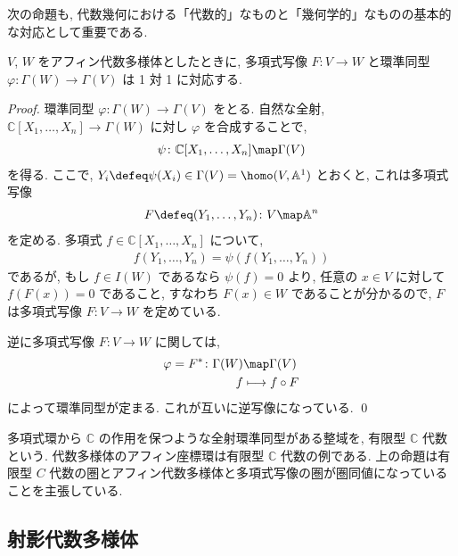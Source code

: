 \documentclass[openany, a4paper, oneside]{jsbook}
\begin{document}
次の命題も, 代数幾何における「代数的」なものと「幾何学的」なものの基本的な対応として重要である.
\begin{prop}
$V$, $W$ をアフィン代数多様体としたときに,
多項式写像 $F \colon V \to W$ と環準同型 $\varphi \colon \Gamma (W) \to \Gamma (V)$ は 1 対 1 に対応する. \fin
\end{prop}
\begin{proof}
環準同型 $\varphi \colon \Gamma (W) \to \Gamma (V)$ をとる.
自然な全射, $\mathbb{C}[X_1,\dots,X_n] \to \Gamma (W)$ に対し $\varphi$ を合成することで,
\begin{align}
 \psi \colon \mathbb{C}[X_1,\dots,X_n] \map \Gamma (V)
\end{align}
を得る.
ここで, $Y_i \defeq  \psi (X_i) \in \Gamma (V) = \homo (V, \mathbb{A}^1)$ とおくと, これは多項式写像
\begin{align}
 F
 \defeq
 (Y_1,\dots,Y_n) \colon V \map \mathbb{A}^n
\end{align}
を定める.
多項式 $f \in \mathbb{C}[X_1,\dots,X_n]$ について,
\begin{align}
 f(Y_1,\dots,Y_n)
 =
 \psi(f(Y_1,\dots,Y_n))
\end{align}
であるが, もし $f \in I (W)$ であるなら $\psi (f)=0$ より,
任意の $x \in V$ に対して $f (F (x))=0$ であること,
すなわち $F (x) \in W$ であることが分かるので, $F$ は多項式写像 $F \colon V \to W$ を定めている.

逆に多項式写像 $F \colon V \to W$ に関しては,
\begin{align}
 \varphi
 =
 F^* \colon \Gamma (W)
 &\map
 \Gamma (V) \\
 f
 &\longmapsto
 f \circ F
\end{align}
によって環準同型が定まる.
これが互いに逆写像になっている. \qed
\end{proof}
\begin{rem}
多項式環から $\mathbb{C}$ の作用を保つような全射環準同型がある整域を,
有限型 $\mathbb{C}$ 代数という.
代数多様体のアフィン座標環は有限型 $\mathbb{C}$ 代数の例である.
上の命題は有限型 $C$ 代数の圏とアフィン代数多様体と多項式写像の圏が圏同値になっていることを主張している. \fin
\end{rem}
\subsection{射影代数多様体}
\end{document}
